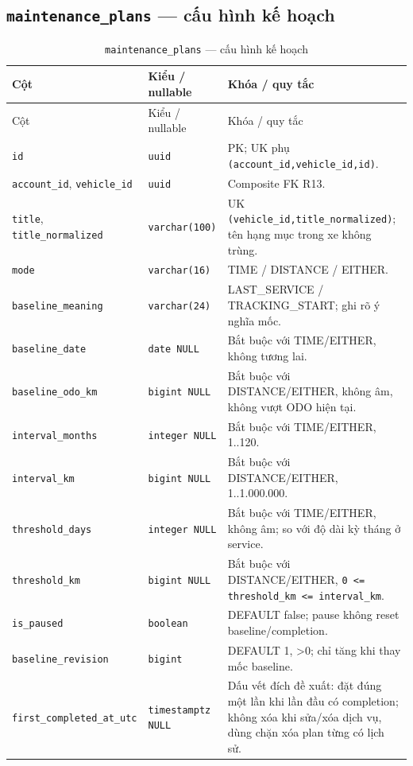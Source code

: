 \subsection{\texttt{maintenance\_\allowbreak{}plans} — cấu hình kế hoạch}
\begin{smalltable}\begin{longtable}{L{3.0cm}L{3.2cm}L{8.2cm}}
\caption{\texttt{maintenance\_\allowbreak{}plans} — cấu hình kế hoạch}\label{tab:dictionary-11}\\\toprule
Cột & Kiểu / nullable & Khóa / quy tắc\\\midrule\endfirsthead
\toprule Cột & Kiểu / nullable & Khóa / quy tắc\\\midrule\endhead
\texttt{id} & \texttt{uuid} & PK; UK phụ \texttt{(account\_\allowbreak{}id,\allowbreak{}vehicle\_\allowbreak{}id,\allowbreak{}id)}.\\
\texttt{account\_\allowbreak{}id}, \texttt{vehicle\_\allowbreak{}id} & \texttt{uuid} & Composite FK R13.\\
\texttt{title}, \texttt{title\_\allowbreak{}normalized} & \texttt{varchar(100)} & UK \texttt{(vehicle\_\allowbreak{}id,\allowbreak{}title\_\allowbreak{}normalized)}; tên hạng mục trong xe không trùng.\\
\texttt{mode} & \texttt{varchar(16)} & TIME / DISTANCE / EITHER.\\
\texttt{baseline\_\allowbreak{}meaning} & \texttt{varchar(24)} & LAST\_SERVICE / TRACKING\_START; ghi rõ ý nghĩa mốc.\\
\texttt{baseline\_\allowbreak{}date} & \texttt{date NULL} & Bắt buộc với TIME/EITHER, không tương lai.\\
\texttt{baseline\_\allowbreak{}odo\_\allowbreak{}km} & \texttt{bigint NULL} & Bắt buộc với DISTANCE/EITHER, không âm, không vượt ODO hiện tại.\\
\texttt{interval\_\allowbreak{}months} & \texttt{integer NULL} & Bắt buộc với TIME/EITHER, 1..120.\\
\texttt{interval\_\allowbreak{}km} & \texttt{bigint NULL} & Bắt buộc với DISTANCE/EITHER, 1..1.000.000.\\
\texttt{threshold\_\allowbreak{}days} & \texttt{integer NULL} & Bắt buộc với TIME/EITHER, không âm; so với độ dài kỳ tháng ở service.\\
\texttt{threshold\_\allowbreak{}km} & \texttt{bigint NULL} & Bắt buộc với DISTANCE/EITHER, \texttt{0 <= threshold\_\allowbreak{}km <= interval\_\allowbreak{}km}.\\
\texttt{is\_\allowbreak{}paused} & \texttt{boolean} & DEFAULT false; pause không reset baseline/completion.\\
\texttt{baseline\_\allowbreak{}revision} & \texttt{bigint} & DEFAULT 1, >0; chỉ tăng khi thay mốc baseline.\\
\texttt{first\_\allowbreak{}completed\_\allowbreak{}at\_\allowbreak{}utc} & \texttt{timestamptz NULL} & Dấu vết đích đề xuất: đặt đúng một lần khi lần đầu có completion; không xóa khi sửa/xóa dịch vụ, dùng chặn xóa plan từng có lịch sử.\\
\bottomrule\end{longtable}\end{smalltable}
